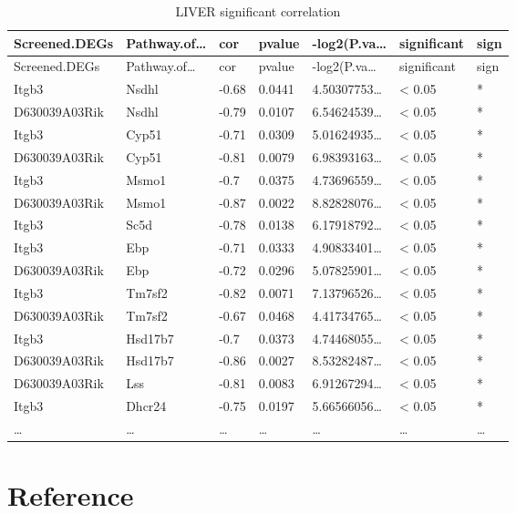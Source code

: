 \documentclass[
]{article}
\begin{document}
\begin{longtable}[]{@{}lllllll@{}}
\caption{\label{tab:LIVER-significant-correlation}LIVER significant correlation}\tabularnewline
\toprule
Screened.DEGs & Pathway.of\ldots{} & cor & pvalue & -log2(P.va\ldots{} & significant & sign\tabularnewline
\midrule
\endfirsthead
\toprule
Screened.DEGs & Pathway.of\ldots{} & cor & pvalue & -log2(P.va\ldots{} & significant & sign\tabularnewline
\midrule
\endhead
Itgb3 & Nsdhl & -0.68 & 0.0441 & 4.50307753\ldots{} & \textless{} 0.05 & *\tabularnewline
D630039A03Rik & Nsdhl & -0.79 & 0.0107 & 6.54624539\ldots{} & \textless{} 0.05 & *\tabularnewline
Itgb3 & Cyp51 & -0.71 & 0.0309 & 5.01624935\ldots{} & \textless{} 0.05 & *\tabularnewline
D630039A03Rik & Cyp51 & -0.81 & 0.0079 & 6.98393163\ldots{} & \textless{} 0.05 & *\tabularnewline
Itgb3 & Msmo1 & -0.7 & 0.0375 & 4.73696559\ldots{} & \textless{} 0.05 & *\tabularnewline
D630039A03Rik & Msmo1 & -0.87 & 0.0022 & 8.82828076\ldots{} & \textless{} 0.05 & *\tabularnewline
Itgb3 & Sc5d & -0.78 & 0.0138 & 6.17918792\ldots{} & \textless{} 0.05 & *\tabularnewline
Itgb3 & Ebp & -0.71 & 0.0333 & 4.90833401\ldots{} & \textless{} 0.05 & *\tabularnewline
D630039A03Rik & Ebp & -0.72 & 0.0296 & 5.07825901\ldots{} & \textless{} 0.05 & *\tabularnewline
Itgb3 & Tm7sf2 & -0.82 & 0.0071 & 7.13796526\ldots{} & \textless{} 0.05 & *\tabularnewline
D630039A03Rik & Tm7sf2 & -0.67 & 0.0468 & 4.41734765\ldots{} & \textless{} 0.05 & *\tabularnewline
Itgb3 & Hsd17b7 & -0.7 & 0.0373 & 4.74468055\ldots{} & \textless{} 0.05 & *\tabularnewline
D630039A03Rik & Hsd17b7 & -0.86 & 0.0027 & 8.53282487\ldots{} & \textless{} 0.05 & *\tabularnewline
D630039A03Rik & Lss & -0.81 & 0.0083 & 6.91267294\ldots{} & \textless{} 0.05 & *\tabularnewline
Itgb3 & Dhcr24 & -0.75 & 0.0197 & 5.66566056\ldots{} & \textless{} 0.05 & *\tabularnewline
\ldots{} & \ldots{} & \ldots{} & \ldots{} & \ldots{} & \ldots{} & \ldots{}\tabularnewline
\bottomrule
\end{longtable}

\hypertarget{bibliography}{%
\section*{Reference}\label{bibliography}}
\end{document}
